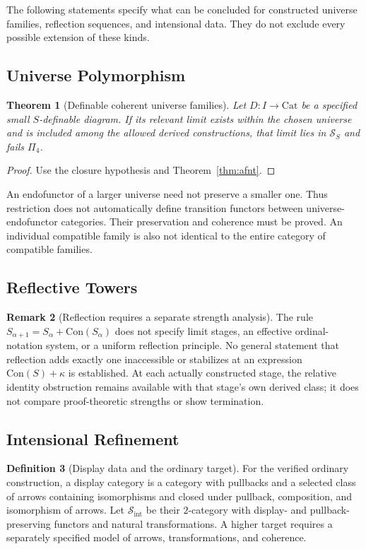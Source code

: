 \documentclass[11pt]{article}
\theoremstyle{plain}
\newtheorem{theorem}{Theorem}[section]
\theoremstyle{definition}
\newtheorem{definition}[theorem]{Definition}
\newtheorem{remark}[theorem]{Remark}
\newcommand{\cS}{\mathcal{S}}
\newcommand{\Sint}{\cS_{\mathrm{int}}}
\newcommand{\Cat}{\mathrm{Cat}}
\newcommand{\Con}{\mathrm{Con}}
\begin{document}
The following statements specify what can be concluded for constructed universe families, reflection sequences, and intensional data. They do not exclude every possible extension of these kinds.

\subsection{Universe Polymorphism}

\begin{theorem}[Definable coherent universe families]\label{thm:universe}
Let $D:I\to\Cat$ be a specified small $S$-definable diagram. If its relevant limit exists within the chosen universe and is included among the allowed derived constructions, that limit lies in $\cS_S$ and fails $\Pi_4$.
\end{theorem}
\begin{proof}
Use the closure hypothesis and Theorem~\ref{thm:afnt}.
\end{proof}
An endofunctor of a larger universe need not preserve a smaller one. Thus restriction does not automatically define transition functors between universe-endofunctor categories. Their preservation and coherence must be proved. An individual compatible family is also not identical to the entire category of compatible families.

\subsection{Reflective Towers}

\begin{remark}[Reflection requires a separate strength analysis]\label{thm:reflective}
The rule $S_{\alpha+1}=S_\alpha+\Con(S_\alpha)$ does not specify limit stages, an effective ordinal-notation system, or a uniform reflection principle. No general statement that reflection adds exactly one inaccessible or stabilizes at an expression $\Con(S)+\kappa$ is established. At each actually constructed stage, the relative identity obstruction remains available with that stage's own derived class; it does not compare proof-theoretic strengths or show termination.
\end{remark}

\subsection{Intensional Refinement}

\begin{definition}[Display data and the ordinary target]\label{def:Sint}
For the verified ordinary construction, a display category is a category with pullbacks and a selected class of arrows containing isomorphisms and closed under pullback, composition, and isomorphism of arrows. Let $\Sint$ be their $2$-category with display- and pullback-preserving functors and natural transformations. A higher target requires a separately specified model of arrows, transformations, and coherence.
\end{definition}
\end{document}
